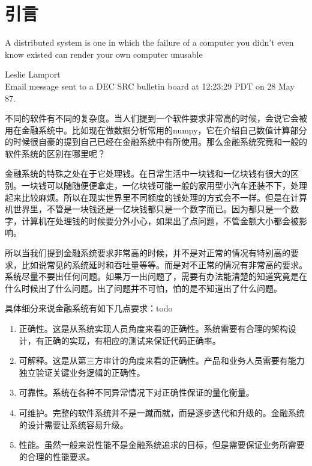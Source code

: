 \chapter*{引言}


\epigraph{A distributed system is one in which the failure of a computer you didn't even know existed can render your own computer unusable}{Leslie Lamport \\ Email message sent to a DEC SRC bulletin board at 12:23:29 PDT on 28 May 87.}


不同的软件有不同的复杂度。当人们提到一个软件要求非常高的时候，会说它会被用在金融系统中。比如现在做数据分析常用的numpy，它在介绍自己数值计算部分的时候很自豪的提到自己已经在金融系统中有所使用。那么金融系统究竟和一般的软件系统的区别在哪里呢？

金融系统的特殊之处在于它处理钱。在日常生活中一块钱和一亿块钱有很大的区别。一块钱可以随随便便拿走，一亿块钱可能一般的家用型小汽车还装不下，处理起来比较麻烦。所以在现实世界里不同额度的钱处理的方式会不一样。但是在计算机世界里，不管是一块钱还是一亿块钱都只是一个数字而已。因为都只是一个数字，计算机在处理钱的时候要分外小心，如果出了点问题，不管金额大小都会被影响。

所以当我们提到金融系统要求非常高的时候，并不是对正常的情况有特别高的要求，比如说常见的系统延时和吞吐量等等。而是对不正常的情况有非常高的要求。系统尽量不要出任何问题。如果万一出问题了，需要有办法能清楚的知道究竟是在什么时候出了什么问题。出了问题并不可怕，怕的是不知道出了什么问题。

具体细分来说金融系统有如下几点要求：todo
\begin{enumerate}
    \item 正确性。这是从系统实现人员角度来看的正确性。系统需要有合理的架构设计，有正确的实现，有相应的测试来保证代码正确率。
    \item 可解释。这是从第三方审计的角度来看的正确性。产品和业务人员需要有能力独立验证关键业务逻辑的正确性。
    \item 可靠性。系统在各种不同异常情况下对正确性保证的量化衡量。
    \item 可维护。完整的软件系统并不是一蹴而就，而是逐步迭代和升级的。金融系统的设计需要让系统容易升级。
    \item 性能。虽然一般来说性能不是金融系统追求的目标，但是需要保证业务所需要的合理的性能要求。
\end{enumerate}

